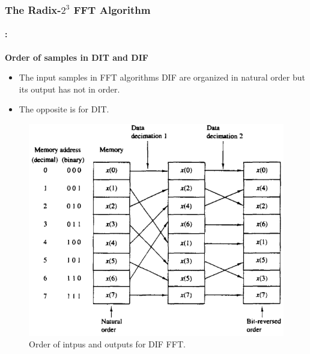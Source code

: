 \begin{frame}
  	\frametitle{\textbf{The Radix-$2^3$ FFT  Algorithm}}
	\framesubtitle{\secname : \subsecname}
	\begin{block}{\centering \textbf{Order of samples in DIT and DIF}}
		\begin{itemize}\justifying\footnotesize
			\item  The input samples in FFT algorithms DIF are organized in natural order but its output has not in order.
			\item The opposite is for DIT.
		\end{itemize}
	\end{block}    	
    \begin{figure}[h!] \centering
    \includegraphics[width=0.4\paperwidth]{./image/dif_order.png}
    	\caption{\footnotesize Order of intpus and outputs for DIF FFT.} %
    \end{figure}
\end{frame}



